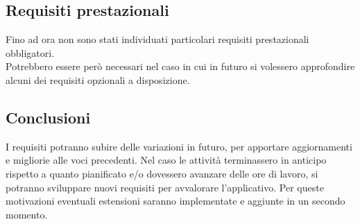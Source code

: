 \subsection{Requisiti prestazionali}
Fino ad ora non sono stati individuati particolari requisiti prestazionali obbligatori.\\
Potrebbero essere però necessari nel caso in cui in futuro si volessero approfondire alcuni dei requisiti opzionali a disposizione. 


\subsection{Conclusioni}
I requisiti potranno subire delle variazioni in futuro, per apportare aggiornamenti e migliorie alle voci precedenti.
Nel caso le attività terminassero in anticipo rispetto a quanto pianificato e/o dovessero avanzare delle ore di lavoro, si potranno sviluppare nuovi
requisiti per avvalorare l'applicativo. Per queste motivazioni eventuali estensioni saranno implementate e aggiunte in un secondo momento.